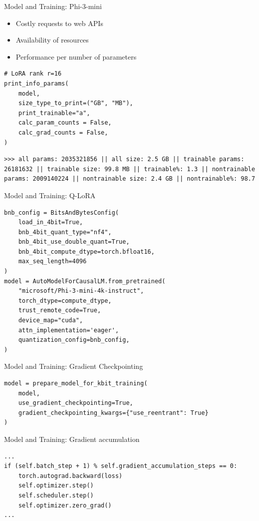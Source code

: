 \documentclass[aspectratio=169,xcolor=dvipsnames]{beamer}
\begin{document}
\begin{frame}[fragile]{Model and Training: Phi-3-mini}
\begin{itemize}
\item Costly requests to web APIs
\item Availability of resources
\item Performance per number of parameters
\end{itemize}
\begin{verbatim}
# LoRA rank r=16
print_info_params(
    model,
    size_type_to_print=("GB", "MB"),
    print_trainable="a",
    calc_param_counts = False,
    calc_grad_counts = False,
)
\end{verbatim}
\begin{verbatim}
>>> all params: 2035321856 || all size: 2.5 GB || trainable params: 26181632 || trainable size: 99.8 MB || trainable%: 1.3 || nontrainable params: 2009140224 || nontrainable size: 2.4 GB || nontrainable%: 98.7
\end{verbatim}
\end{frame}
\begin{frame}[fragile]{Model and Training: Q-LoRA}
\begin{verbatim}
bnb_config = BitsAndBytesConfig(
    load_in_4bit=True,
    bnb_4bit_quant_type="nf4",
    bnb_4bit_use_double_quant=True,
    bnb_4bit_compute_dtype=torch.bfloat16, 
    max_seq_length=4096
)
model = AutoModelForCausalLM.from_pretrained(
    "microsoft/Phi-3-mini-4k-instruct",
    torch_dtype=compute_dtype,
    trust_remote_code=True,
    device_map="cuda",
    attn_implementation='eager',
    quantization_config=bnb_config,
)
\end{verbatim}
\end{frame}
\begin{frame}[fragile]{Model and Training: Gradient Checkpointing}
\begin{verbatim}
model = prepare_model_for_kbit_training(
    model,
    use_gradient_checkpointing=True,
    gradient_checkpointing_kwargs={"use_reentrant": True}
)
\end{verbatim}
\end{frame}
\begin{frame}[fragile]{Model and Training: Gradient accumulation}
\begin{verbatim}
...
if (self.batch_step + 1) % self.gradient_accumulation_steps == 0:
    torch.autograd.backward(loss)
    self.optimizer.step()
    self.scheduler.step()
    self.optimizer.zero_grad()
...
\end{verbatim}
\end{frame}
\end{document}
